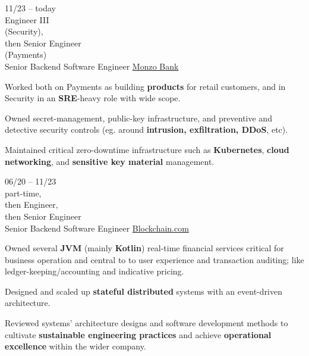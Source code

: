 \begin{entrylist}


    \entry
    {
        11/23 -- today \\\footnotesize{Engineer III \\ (Security),\\ then Senior Engineer \\ (Payments)}        \\
    }
    {Senior Backend Software Engineer}
    {\href{https://monzo.com}{Monzo Bank}}
    {
        Worked both on Payments as building \textbf{products} for retail customers, and in Security in an \textbf{SRE}-heavy role with wide scope.

        \para

        Owned secret-management, public-key infrastructure, and preventive and detective security controls (eg. around \textbf{intrusion, exfiltration, DDoS}, etc).

        \para

        Maintained critical zero-downtime infrastructure such as \textbf{Kubernetes}, \textbf{cloud networking}, and \textbf{sensitive key material} management.
    }
    \entry
    {
        06/20 -- 11/23   \\\footnotesize{part-time,\\ then Engineer,\\ then Senior Engineer}        \\
    }
    {Senior Backend Software Engineer}
    {\href{https://blockchain.com/about}{Blockchain.com}}
    {
        Owned several \textbf{JVM} (mainly \textbf{Kotlin}) real-time financial services critical for business operation and central to
        to user experience and transaction auditing; like ledger-keeping/accounting and indicative pricing.

        \para
        Designed and scaled up \textbf{stateful distributed} systems with an event-driven architecture.

        \para
        Reviewed systems' architecture designs and software development methods to cultivate \textbf{sustainable engineering practices}
        and achieve \textbf{operational excellence} within the wider company.



}
\end{entrylist}
